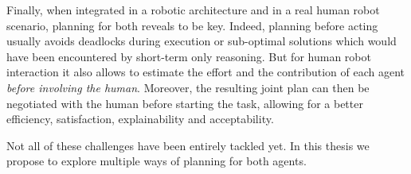 \documentclass[a4paper,11pt,twoside]{StyleThese}
\begin{document}
Finally, when integrated in a robotic architecture and in a real human robot scenario, planning for both reveals to be key. Indeed, planning before acting usually avoids deadlocks during execution or sub-optimal solutions which would have been encountered by short-term only reasoning. But for human robot interaction it also allows to estimate the effort and the contribution of each agent \textit{before involving the human}. Moreover, the resulting joint plan can then be negotiated with the human before starting the task, allowing for a better efficiency, satisfaction, explainability and acceptability.

Not all of these challenges have been entirely tackled yet. In this thesis we propose to explore multiple ways of planning for both agents. 

\ifdefined{}
\else


\end{document}
